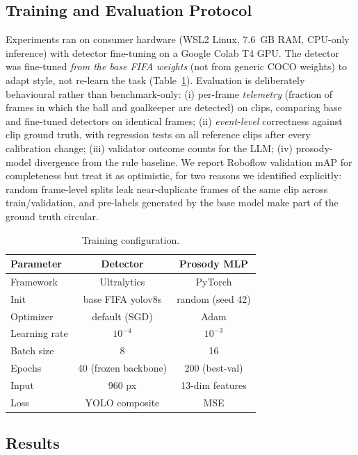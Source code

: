 \documentclass[10pt,twocolumn,a4paper]{article}
\begin{document}
	\subsection{Training and Evaluation Protocol}

	Experiments ran on consumer hardware (WSL2 Linux, 7.6~GB RAM, CPU-only inference) with detector fine-tuning on a Google Colab T4 GPU. The detector was fine-tuned \emph{from the base FIFA weights} (not from generic COCO weights) to adapt style, not re-learn the task (Table~\ref{tab:training}). Evaluation is deliberately behavioural rather than benchmark-only: (i) per-frame \emph{telemetry} (fraction of frames in which the ball and goalkeeper are detected) on clips, comparing base and fine-tuned detectors on identical frames; (ii) \emph{event-level} correctness against clip ground truth, with regression tests on all reference clips after every calibration change; (iii) validator outcome counts for the LLM; (iv) prosody-model divergence from the rule baseline. We report Roboflow validation mAP for completeness but treat it as optimistic, for two reasons we identified explicitly: random frame-level splits leak near-duplicate frames of the same clip across train/validation, and pre-labels generated by the base model make part of the ground truth circular.

	\begin{table}[h]
		\centering
		\caption{Training configuration.}
		\label{tab:training}
		\begin{tabular}{|l|c|c|}
			\hline
			\textbf{Parameter} & \textbf{Detector} & \textbf{Prosody MLP} \\
			\hline
			Framework & Ultralytics & PyTorch \\
			Init & base FIFA yolov8s & random (seed 42) \\
			Optimizer & default (SGD) & Adam \\
			Learning rate & $10^{-4}$ & $10^{-3}$ \\
			Batch size & 8 & 16 \\
			Epochs & 40 (frozen backbone) & 200 (best-val) \\
			Input & 960 px & 13-dim features \\
			Loss & YOLO composite & MSE \\
			\hline
		\end{tabular}
	\end{table}

	\subsection{Results}
\end{document}
